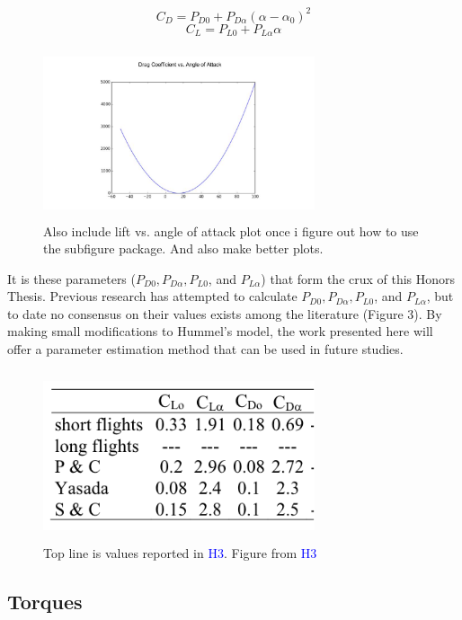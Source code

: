 \documentclass[a4paper,12pt, oneside]{article}
\newcommand{\blue}[1]{\textcolor{blue}{#1}}
\begin{document}
\begin{equation}
  C_D=P_{D0}+P_{D\alpha}(\alpha-\alpha_0)^2
\end{equation}
\begin{equation}
  C_L=P_{L0}+P_{L\alpha}\alpha
\end{equation}
\begin{figure}[H]
	\centering
	\includegraphics[width=8cm, height=5cm]{DragCoefficientPlot}
	\caption{\color{red}Also include lift vs. angle of attack plot once i figure out how to use the subfigure package. And also make better plots. \color{black}}
\end{figure}
It is these parameters ($P_{D0}, P_{D\alpha}, P_{L0}$, and $P_{L\alpha}$) that form the crux of this Honors Thesis. Previous research has attempted to calculate $P_{D0}, P_{D\alpha}, P_{L0}$, and $P_{L\alpha}$, but to date no consensus on their values exists among the literature (Figure 3). By making small modifications to Hummel's model, the work presented here will offer a parameter estimation method that can be used in future studies.

\begin{figure}[H]
	\centering
	\includegraphics[width=8cm, height=5cm]{ParameterValues}
	\caption{\color{red}Top line is values reported in \blue{H3}. Figure from \blue{H3} \color{black}}
\end{figure}

\subsection{Torques}
\end{document}
